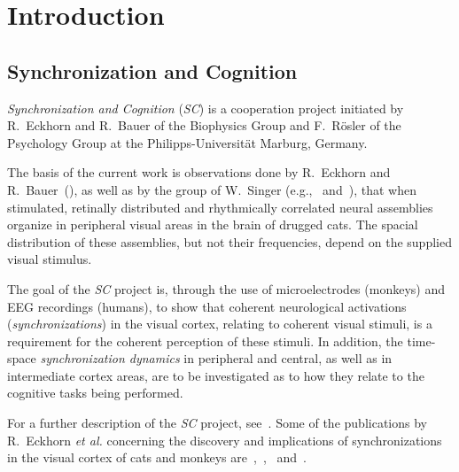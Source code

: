 
\chapter{Introduction}
\label{intro}

\section{Synchronization and Cognition}
\label{intro:synch}

{\em Synchronization and Cognition\/} ({\em SC\/}) is a cooperation
project initiated by R.\ Eckhorn and R.\ Bauer of the Biophysics Group
and F.\ R\"{o}sler of the  Psychology
Group at the Philipps-Universit\"{a}t Marburg, Germany.

The basis of the current work is observations done by R.\ Eckhorn and
R.\ Bauer~(\cite{cat}), as well as by the group of W.\ Singer
(e.g.,~\cite{singer2} and~\cite{singer1}), that when stimulated,
retinally distributed and rhythmically correlated neural assemblies
organize in peripheral visual areas in the brain of drugged cats.  The
spacial distribution of these assemblies, but not their frequencies,
depend on the supplied visual stimulus.

The goal of the {\em SC\/} project is, through the use of
microelectrodes (monkeys) and EEG recordings (humans), to show that
coherent neurological activations ({\em synchronizations\/}) in the
visual cortex, relating to coherent visual stimuli, is a requirement
for the coherent perception of these stimuli.  In addition, the
time-space {\em synchronization dynamics\/} in peripheral and central,
as well as in intermediate cortex areas, are to be investigated as to
how they relate to the cognitive tasks being performed.

For a further description of the {\em SC\/} project,
see~\cite{antrag}.  Some of the publications by R.\ Eckhorn {\em et
  al.\/} concerning the discovery and implications of synchronizations
in the visual cortex of cats and monkeys
are~\cite{eckhorn1},~\cite{eckhorn2},~\cite{cat} and~\cite{eckhorn3}.

